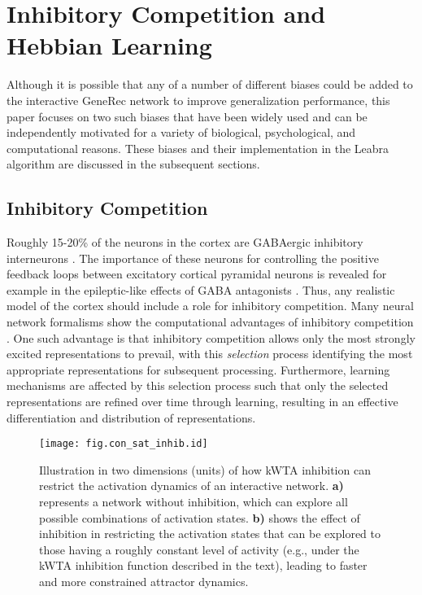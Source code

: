 \documentclass[12pt,twoside]{article}
\begin{document}
\section{Inhibitory Competition and Hebbian Learning}

Although it is possible that any of a number of different biases could
be added to the interactive GeneRec network to improve generalization
performance, this paper focuses on two such biases that have been
widely used and can be independently motivated for a variety of
biological, psychological, and computational reasons.  These biases
and their implementation in the Leabra algorithm are discussed in the
subsequent sections.

\subsection{Inhibitory Competition}

Roughly 15-20\% of the neurons in the cortex are GABAergic inhibitory
interneurons \cite{WhiteEl89,GabbotSomogyi86}.  The importance of
these neurons for controlling the positive feedback loops between
excitatory cortical pyramidal neurons is revealed for example in the
epileptic-like effects of GABA antagonists
\cite[e.g.,]{GrinvaldFrostigLieke88}.  Thus, any realistic model of
the cortex should include a role for inhibitory competition.  Many
neural network formalisms show the computational advantages of
inhibitory competition
\cite[e.g.,]{Grossberg76,Kohonen84,McClellandRumelhart81,RumelhartZipser86}.
One such advantage is that inhibitory competition allows only the most
strongly excited representations to prevail, with this {\em selection}
process identifying the most appropriate representations for
subsequent processing.  Furthermore, learning mechanisms are affected
by this selection process such that only the selected representations
are refined over time through learning, resulting in an effective
differentiation and distribution of representations.

\begin{figure}
  \centering\texttt{[image: fig.con\_sat\_inhib.id]}
  \caption{\small Illustration in two dimensions (units) of how kWTA
    inhibition can restrict the activation dynamics of an interactive
    network. {\bf a)} represents a network without inhibition, which
    can explore all possible combinations of activation states.  {\bf
      b)} shows the effect of inhibition in restricting the activation
    states that can be explored to those having a roughly constant
    level of activity (e.g., under the kWTA inhibition function
    described in the text), leading to faster and more
    constrained attractor dynamics.}
  \label{fig.con_sat_inhib}
\end{figure}
\end{document}
